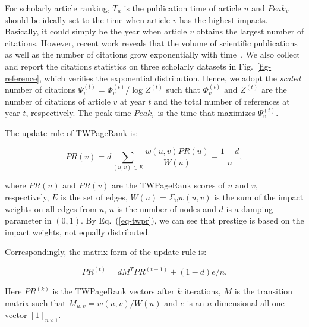 For scholarly article ranking, $T_u$ is the publication time of article $u$ and $Peak_v$ should be ideally set to the time when article $v$ has the highest impacts. Basically, it could simply be the year when article $v$ obtains the largest number of citations. However, recent work reveals that the volume of scientific publications as well as the number of citations grow exponentially with time~\cite{Dong2017KDD,BornmannM15}. We also collect and report the citations statistics on three scholarly datasets in Fig.~\ref{fig-reference}, which verifies the exponential distribution. Hence, we adopt the {\em scaled} number of citations $\Psi_v^{(t)}=\Phi_v^{(t)} / \log Z^{(t)}$ such that $\Phi_v^{(t)}$ and $Z^{(t)}$ are the number of citations of article $v$ at year $t$ and the total number of references at year $t$, respectively. The peak time $Peak_v$ is the time that maximizes $\Psi_v^{(t)}$.



The update rule of TWPageRank is:

\vspace{-1ex}
\begin{small}
\begin{equation}\label{eq-twpr}
PR(v)=d\sum_{(u,v)\in E} \frac{w(u,v)PR(u)}{W(u)}+\frac{1-d}{n},
\end{equation}
\end{small}
%
\noindent where $PR(u)$ and $PR(v)$ are the TWPageRank scores of $u$ and $v$, respectively, $E$ is the set of edges, $W(u)=\Sigma_{v} w(u,v)$ is the sum of the impact weights on all edges from $u$, $n$ is the number of nodes and $d$ is a damping parameter in $(0, 1)$. By Eq.~(\ref{eq-twpr}), we can see that prestige is based on the impact weights, not equally distributed.

Correspondingly, the matrix form of the update rule is:

\vspace{-1ex}
\begin{small}
\begin{equation}
\label{eq-twpr-update}
PR^{(t)}=d M^T  PR^{(t-1)} + (1-d) e/n.
\end{equation}
\end{small}
%
\noindent
Here $PR^{(k)}$ is the TWPageRank vectors after $k$ iterations,  $M$ is the transition matrix such that $M_{u,v}=w(u,v)/W(u)$ and  $e$ is an $n$-dimensional all-one vector $[1]_{n\times1}$.

